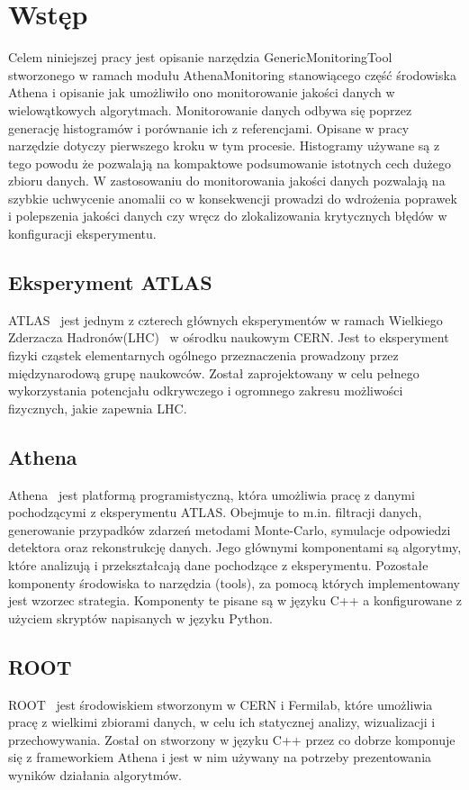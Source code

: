 \section{Wstęp}
Celem niniejszej pracy jest opisanie narzędzia \mbox{GenericMonitoringTool} stworzonego w ramach modułu \mbox{AthenaMonitoring} stanowiącego część środowiska Athena i opisanie jak umożliwiło ono monitorowanie jakości danych w wielowątkowych algorytmach. 
Monitorowanie danych odbywa się poprzez generację histogramów i porównanie ich z referencjami. Opisane w pracy narzędzie dotyczy pierwszego kroku w tym procesie.
Histogramy używane są z tego powodu że pozwalają na kompaktowe podsumowanie istotnych cech dużego zbioru danych. 
W zastosowaniu do monitorowania jakości danych pozwalają na szybkie uchwycenie anomalii co w konsekwencji prowadzi do wdrożenia poprawek i polepszenia jakości danych czy wręcz do zlokalizowania krytycznych błędów w konfiguracji eksperymentu. 

\subsection{Eksperyment ATLAS}
ATLAS~\cite{cern-atlas} jest jednym z czterech głównych eksperymentów w ramach Wielkiego Zderzacza Hadronów(LHC)~\cite{cern-lhc} w ośrodku naukowym CERN. 
Jest to eksperyment fizyki cząstek elementarnych ogólnego przeznaczenia prowadzony przez międzynarodową grupę naukowców. 
Został zaprojektowany w celu pełnego wykorzystania potencjału odkrywczego i ogromnego zakresu możliwości fizycznych, jakie zapewnia LHC.

\subsection{Athena}
Athena~\cite{cern-athena} jest platformą programistyczną, która umożliwia pracę z danymi pochodzącymi z eksperymentu ATLAS. 
Obejmuje to m.in. filtracji danych, generowanie przypadków zdarzeń metodami Monte-Carlo, symulacje odpowiedzi detektora oraz rekonstrukcję danych. 
Jego głównymi komponentami są algorytmy, które analizują i przekształcają dane pochodzące z eksperymentu. 
Pozostałe komponenty środowiska to narzędzia (tools), za pomocą których implementowany jest wzorzec strategia. 
Komponenty te pisane są w języku C++ a konfigurowane z użyciem skryptów napisanych w języku Python. 

\subsection{ROOT}
ROOT~\cite{cern-root} jest środowiskiem stworzonym w CERN i Fermilab, które umożliwia pracę z wielkimi zbiorami danych, w celu ich statycznej analizy, wizualizacji i przechowywania. 
Został on stworzony w języku C++ przez co dobrze komponuje się z frameworkiem Athena i jest w nim używany na potrzeby prezentowania wyników działania algorytmów. 

